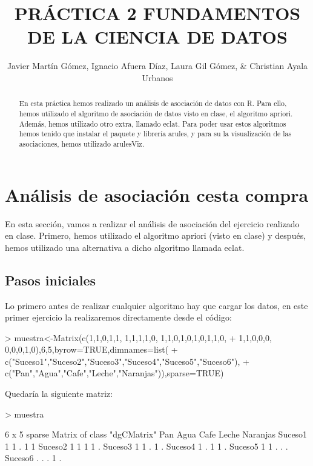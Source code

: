 \documentclass [a4paper] {article}
\title{PRÁCTICA 2 FUNDAMENTOS DE LA CIENCIA DE DATOS}
\author{Javier Martín Gómez, Ignacio Afuera Díaz, Laura Gil Gómez, & Christian Ayala Urbanos}
\begin{document}
\maketitle

\begin{abstract}
En esta práctica hemos realizado un análisis de asociación de datos con R. Para ello,
hemos utilizado el algoritmo de asociación de datos visto en clase, el algoritmo
apriori. Además, hemos utilizado otro extra, llamado eclat. Para poder usar estos
algoritmos hemos tenido que instalar el paquete y librería arules, y para su
la visualización de las asociaciones, hemos utilizado arulesViz.

\end{abstract}

\newpage
\tableofcontents
\newpage


\section{Análisis de asociación cesta compra }
En esta sección, vamos a realizar el análisis de asociación del ejercicio realizado
en clase. Primero, hemos utilizado el algoritmo apriori (visto en clase) y después,
hemos utilizado una alternativa a dicho algoritmo llamada eclat.
\subsection{Pasos iniciales}
Lo primero antes de realizar cualquier algoritmo hay que cargar los datos, en este
primer ejercicio la realizaremos directamente desde el código:

\begin{Schunk}
\begin{Sinput}
> muestra<-Matrix(c(1,1,0,1,1, 1,1,1,1,0, 1,1,0,1,0,1,0,1,1,0, 
+ 1,1,0,0,0, 0,0,0,1,0),6,5,byrow=TRUE,dimnames=list(
+ c("Suceso1","Suceso2","Suceso3","Suceso4","Suceso5","Suceso6"),
+ c("Pan","Agua","Cafe","Leche","Naranjas")),sparse=TRUE)
\end{Sinput}
\end{Schunk}

Quedaría la siguiente matriz:

\begin{Schunk}
\begin{Sinput}
> muestra
\end{Sinput}
\begin{Soutput}
6 x 5 sparse Matrix of class "dgCMatrix"
        Pan Agua Cafe Leche Naranjas
Suceso1   1    1    .     1        1
Suceso2   1    1    1     1        .
Suceso3   1    1    .     1        .
Suceso4   1    .    1     1        .
Suceso5   1    1    .     .        .
Suceso6   .    .    .     1        .
\end{Soutput}
\end{Schunk}
\end{document}
